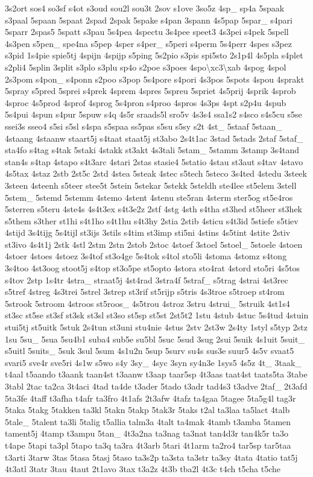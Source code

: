 \begin{DoxyCompactItemize}
3s2ort sos4 so3sf s4ot s3oud sou2l sou3t 2sov s1ove 3so5z 4sp\-\_\- sp4a 5spaak s3paal 5spaan 5spaat 2spad 2spak 5spake s4pan 3spann 4s5pap 5spar\-\_\- s4pari 5sparr 2spas5 5spatt s3pau 5s4pea 4spectu 3s4pee speet3 4s3pei s4pek 5spell 4s3pen s5pen\-\_\- spe4na s5pep 4sper s4per\-\_\- s5peri s4perm 5s4perr 4spes s3pez s3pid 1s4pie spie5tj 4spijn 4spijp s5ping 5s2pio s3pis spi5sto 2s1p4l 4s5pla s4plet s2pli4 5splin 3split s3plo s3plu sp4o s2poe s3poes 4spo\textbackslash{}xc3\textbackslash{}xab 4spog 4spol 2s3pom s4pon\-\_\- s4ponn s2poo s3pop 5s4pore s4pori 4s3pos 5spots 4spou 4sprakt 5spray s5pred 5sprei s4prek 4sprem 4spres 5spreu 5spriet 4s5prij 4sprik 4sprob 4sproc 4s5prod 4sprof 4sprog 5s4pron s4proo 4spros 4s3ps 4spt s2p4u 4spub 5s4pui 4spun s4pur 5spuw s4q 4s5r sraads5l sro5v 4s3s4 ssa1s2 s4sco s4s5cu s5se ssei3s sseo4 s5si s5sl s4spa s5spaa ss5pas s5su s5sy s2t 4st\-\_\- 5staaf 5staan\-\_\- 4staang 4staanw staart5j s4taat staat5j st3abo 2s4t1ac 3stad 5stads 2staf 5staf\-\_\- sta4fo s4tag s4tak 5staki 4stakk st3akt 4s3tali 5stam\-\_\- 5stamm 3stamp 3s4tand stan4s s4tap 4stapo s4t3arc 4stari 2stas stasie4 5statio 4stau st3aut s4tav 4stavo 4s5tax 4staz 2stb 2st5c 2std 4stea 5steak 4stec s5tech 5steco 3s4ted 4stedu 3steek 3steen 4steenh s5teer stee5t 5stein 5stekar 5stekk 5steldh ste4lee st5elem 3stell 5stem\-\_\- 5stemd 5stemm 4stemo 4stent 4stenu ste5ran 4sterm ster5og st5e4ros 5sterren s5teru 4ste4s 4s4t3ex s4t3e2z 2stf 4stg 4sth s4tha st3hed st5heer st3hek s5them s3ther st1hi s4t1ho s4t1hu s4t3hy 2stia 2stib 4sticu s4t3id 5stiefe s5tiev 4stijd 3s4tijg 5s4tijl st3ijs 3stils s4tim st3imp sti5ni 4stins 4s5tint 4stite 2stiv st3ivo 4s4t1j 2stk 4stl 2stm 2stn 2stob 2stoc 4stoef 3stoel 5stoel\-\_\- 5stoele 4stoen 4stoer 4stoes 4stoez 3s4tof st3o4ge 5s4tok s4tol sto5li 4stoma 4stomz s4tong 3s4too 4st3oog stoot5j s4top st3o5pe st5opto 4stora sto4rat 4stord sto5ri 4s5tos s4tov 2stp 1s4tr 4stra\-\_\- straat5j 4st4rad 3stra4f 5straf\-\_\- s5trag 4strai 4st3rec s5tref 4streg 4s3trei 5strel 3strep st3rif st5rijp s5tris 4s3troe s5troep st4rom 5strook 5stroom 4stroos st5roos\-\_\- 4s5trou 4stroz 3stru 4strui\-\_\- 5struik 4st1s4 st3sc st5se st3sf st3sk st3sl st3so st5sp st5st 2st5t2 1stu 4stub 4stuc 5s4tud 4stuin stui5tj st5uitk 5stuk 2s4tun st3uni stu4nie 4stus 2stv 2st3w 2s4ty 1styl s5typ 2stz 1su 5su\-\_\- 5sua 5su4b1 suba4 sub5e su5bl 5suc 5sud 3sug 2sui 5suik 4s1uit 5suit\-\_\- s5uitl 5suits\-\_\- 5suk 3sul 5sum 4s1u2n 5sup 5surv su4s sus3e suur5 4s5v svaat5 svari5 sve4r sve5ri 4s1w s5wo s4y 3sy\-\_\- 4syc 3syn sy4n3e 1sys5 4s5z 4t\-\_\- 3taak\-\_\- t4aal t5aando t3aank taan4st t3aanw t3aap taar5sp 4t3aas taat4st taats5ta 3tabe 3tabl 2tac ta2ca 3t4aci 4tad ta4de t3ader 5tado t3adr tad4s3 t3adve 2taf\-\_\- 2t3afd 5ta3fe 4taff t3afha t4afr ta3fro 4t1afs 2t3afw 4tafz ta4gaa 5tagee 5ta5g4l tag3r 5taka 5takg 5takken ta3kl 5takn 5takp 5tak3r 5taks t2al ta3laa ta5lact 4talb 5tale\-\_\- 5talent ta3li 5talig t5allia talm3a 4talt ta4mak 4tamb t3amba 5tamen tament5j 4tamp t3ampu 5tan\-\_\- 4t3a2na ta3nag ta3nat tan4d3r tan4k5r ta3o t4ape 5tapi ta3pl 5tapo ta3q ta3ra 4t3arb 5tari 4t1arm ta2ro4 tar5sp tar5taa t3arti 3tarw 3tas 5tasa 5tasj 5taso ta3s2p ta3sta ta3str ta3sy 4tata 4tatio tat5j 4t3atl 3tatr 3tau 4taut 2t1avo 3tax t3a2z 4t3b tba2l 4t3c t4ch t5cha t5che 
\end{DoxyCompactItemize}
